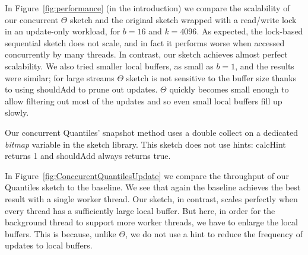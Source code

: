 In Figure~\ref{fig:performance} (in the introduction) we compare the scalability
of our concurrent $\Theta$ sketch and the original sketch wrapped
with a read/write lock in an update-only workload, for $b=16$ and $k=4096$.
As expected, the lock-based sequential sketch does not scale, and
in fact it performs worse when accessed concurrently by many
threads.
In contrast, our sketch achieves almost perfect scalability.
We also tried smaller local buffers, as small as $b=1$,
and the results were similar; for large streams $\Theta$ sketch
is not sensitive to the buffer size thanks to using shouldAdd to
prune out updates. $\Theta$ quickly
becomes small enough to allow filtering out most of the updates and so even small
local buffers fill up slowly.

Our concurrent Quantiles' snapshot method uses a double collect
on a dedicated \emph{bitmap} variable in the sketch library. This sketch
does not use hints: calcHint returns 1 and shouldAdd always returns true.

In Figure~\ref{fig:ConccurentQuantilesUpdate} we compare the
throughput of our Quantiles sketch to the baseline.
We see that again the baseline achieves the best result with a single worker thread.
Our sketch, in contrast, scales perfectly when every thread
has a sufficiently large local buffer.
But here, in order for the
background thread to support more worker threads, we have to
enlarge the local buffers. This is because, unlike $\Theta$,
we do not use a hint to reduce the frequency of updates to local buffers.